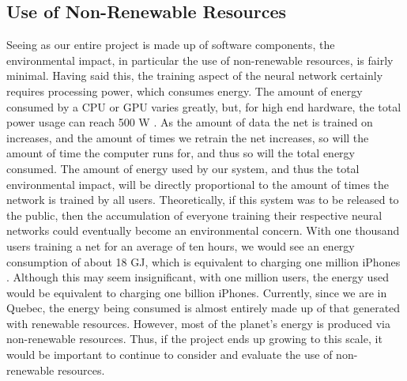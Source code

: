 
\subsection{Use of Non-Renewable Resources}
Seeing as our entire project is made up of software components, the environmental impact, in particular the use of non-renewable resources, is fairly minimal. Having said this, the training aspect of the neural network certainly requires processing power, which consumes energy. The amount of energy consumed by a CPU or GPU varies greatly, but, for high end hardware, the total power usage can reach 500 W \cite{GPU}. As the amount of data the net is trained on increases, and the amount of times we retrain the net increases, so will the amount of time the computer runs for, and thus so will the total energy consumed. The amount of energy used by our system, and thus the total environmental impact, will be directly proportional to the amount of times the network is trained by all users. Theoretically, if this system was to be released to the public, then the accumulation of everyone training their respective neural networks could eventually become an environmental concern. With one thousand users training a net for an average of ten hours, we would see an energy consumption of about 18 GJ, which is equivalent to charging one million iPhones \cite{iphone}. Although this may seem insignificant, with one million users, the energy used would be equivalent to charging one billion iPhones. Currently, since we are in Quebec, the energy being consumed is almost entirely made up of that generated with renewable resources. However, most of the planet's energy is produced via non-renewable resources\cite{energy}. Thus, if the project ends up growing to this scale, it would be important to continue to consider and evaluate the use of non-renewable resources.

